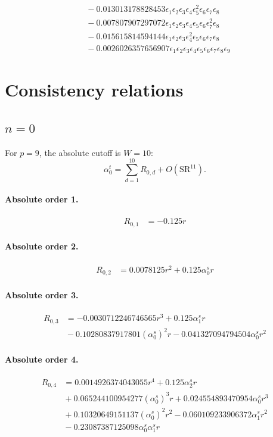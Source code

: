 \documentclass[10pt]{article}
\begin{document}
\begin{align*}
&{}  - 0.013013178828453 \epsilon_{1} \epsilon_{2} \epsilon_{3} \epsilon_{4} \epsilon_{5}^{2} \epsilon_{6} \epsilon_{7} \epsilon_{8} \\
&{}  - 0.007807907297072 \epsilon_{1} \epsilon_{2} \epsilon_{3} \epsilon_{4} \epsilon_{5} \epsilon_{6} \epsilon_{7}^{2} \epsilon_{8} \\
&{}  - 0.015615814594144 \epsilon_{1} \epsilon_{2} \epsilon_{3} \epsilon_{4}^{2} \epsilon_{5} \epsilon_{6} \epsilon_{7} \epsilon_{8} \\
&{}  - 0.0026026357656907 \epsilon_{1} \epsilon_{2} \epsilon_{3} \epsilon_{4} \epsilon_{5} \epsilon_{6} \epsilon_{7} \epsilon_{8} \epsilon_{9}
\end{align*}

\section{Consistency relations}
\subsection{$n=0$}
For $p=9$, the absolute cutoff is $W=10$:
\[\alpha_{0}^t=\sum_{d=1}^{10}R_{0,d}+O(\mathrm{SR}^{11}).\]
\paragraph{Absolute order 1.}
\begin{align*}
R_{0,1} &=  - 0.125 r
\end{align*}

\paragraph{Absolute order 2.}
\begin{align*}
R_{0,2} &= 0.0078125 r^{2} + 0.125 \alpha_{0}^s r
\end{align*}

\paragraph{Absolute order 3.}
\begin{align*}
R_{0,3} &=  - 0.0030712246746565 r^{3} + 0.125 \alpha_{1}^s r \\
&{}  - 0.10280837917801 \left(\alpha_{0}^s\right)^{2} r - 0.041327094794504 \alpha_{0}^s r^{2}
\end{align*}

\paragraph{Absolute order 4.}
\begin{align*}
R_{0,4} &= 0.0014926374043055 r^{4} + 0.125 \alpha_{2}^s r \\
&{}  + 0.065244100954277 \left(\alpha_{0}^s\right)^{3} r + 0.024554893470954 \alpha_{0}^s r^{3} \\
&{}  + 0.10320649151137 \left(\alpha_{0}^s\right)^{2} r^{2} - 0.060109233906372 \alpha_{1}^s r^{2} \\
&{}  - 0.23087387125098 \alpha_{0}^s \alpha_{1}^s r
\end{align*}
\end{document}
